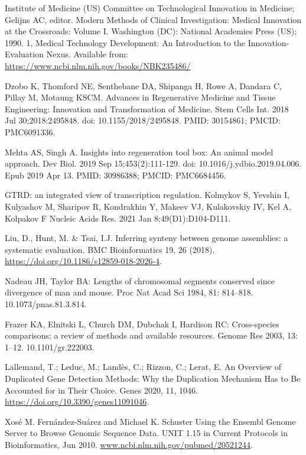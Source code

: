 \documentclass[12pt]{article}
\begin{document}

\normalsize
\begin{thebibliography}{99}

 Institute of Medicine (US) Committee on Technological
Innovation in Medicine; Gelijns AC, editor. Modern Methods of Clinical
Investigation: Medical Innovation at the Crossroads: Volume I. Washington (DC):
National Academies Press (US); 1990. 1, Medical Technology Development: An
Introduction to the Innovation-Evaluation Nexus.
Available from: \url{https://www.ncbi.nlm.nih.gov/books/NBK235486/}

 Dzobo K, Thomford NE, Senthebane DA, Shipanga H, Rowe A,
Dandara C, Pillay M, Motaung KSCM. Advances in Regenerative Medicine and Tissue
Engineering: Innovation and Transformation of Medicine. Stem Cells Int.
2018 Jul 30;2018:2495848. doi: 10.1155/2018/2495848. PMID: 30154861;
PMCID: PMC6091336.

 Mehta AS, Singh A. Insights into regeneration tool box:
An animal model approach. Dev Biol. 2019 Sep 15;453(2):111-129.
doi: 10.1016/j.ydbio.2019.04.006. Epub 2019 Apr 13. PMID: 30986388;
PMCID: PMC6684456.

 GTRD: an integrated view of transcription regulation.
Kolmykov S, Yevshin I, Kulyashov M, Sharipov R, Kondrakhin Y, Makeev VJ,
Kulakovskiy IV, Kel A, Kolpakov F Nucleic Acids Res. 2021 Jan
8;49(D1):D104-D111.

 Liu, D., Hunt, M. \& Tsai, I.J. Inferring synteny between
genome assemblies: a systematic evaluation. BMC Bioinformatics 19, 26 (2018).
\url{https://doi.org/10.1186/s12859-018-2026-4}.

 Nadeau JH, Taylor BA: Lengths of chromosomal segments
conserved since divergence of man and mouse. Proc Nat Acad Sci 1984,
81: 814–818. 10.1073/pnas.81.3.814.

 Frazer KA, Elnitski L, Church DM, Dubchak I, Hardison RC:
Cross-species comparisons: a review of methods and available resources.
Genome Res 2003, 13: 1–12. 10.1101/gr.222003.

 Lallemand, T.; Leduc, M.; Landès, C.; Rizzon, C.; Lerat, E.
An Overview of Duplicated Gene Detection Methods: Why the Duplication Mechanism
Has to Be Accounted for in Their Choice. Genes 2020, 11, 1046.
\url{https://doi.org/10.3390/genes11091046}.

 Xosé M. Fernández-Suárez and Michael K. Schuster
Using the Ensembl Genome Server to Browse Genomic Sequence Data.
UNIT 1.15 in Current Protocols in Bioinformatics, Jun 2010.
\url{www.ncbi.nlm.nih.gov/pubmed/20521244}.


\end{thebibliography}
\end{document}
